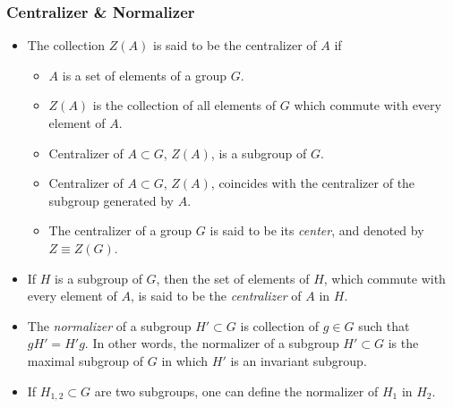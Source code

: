 \subsubsection{Centralizer \& Normalizer}
\begin{itemize}
	\item The collection $Z(A)$ is said to be the centralizer of $A$ if
	\begin{itemize}
		\item $A$ is a set of elements of a group $G$.
		\item $Z(A)$ is the collection of all elements of $G$ which commute with every element of $A$.
		\item Centralizer of $A\subset G$, $Z(A)$, is a subgroup of $G$.
		\item Centralizer of $A\subset G$, $Z(A)$, coincides with the centralizer of the subgroup generated by $A$.
		\item The centralizer of a group $G$ is said to be its \emph{center}, and denoted by $Z\equiv Z(G)$.
	\end{itemize}
	\item If $H$ is a subgroup of $G$, then the set of elements of $H$, which commute with every element of $A$, is said to be the \emph{centralizer} of $A$ in $H$.
	\item The \emph{normalizer} of a subgroup $H'\subset G$ is collection of $g\in G$ such that $gH'=H'g$. In other words, the normalizer of a subgroup $H'\subset G$ is the maximal subgroup of $G$ in which $H'$ is an invariant subgroup.
	\item If $H_{1,2}\subset G$ are two subgroups, one can define the normalizer of $H_1$ in $H_2$.
\end{itemize}
